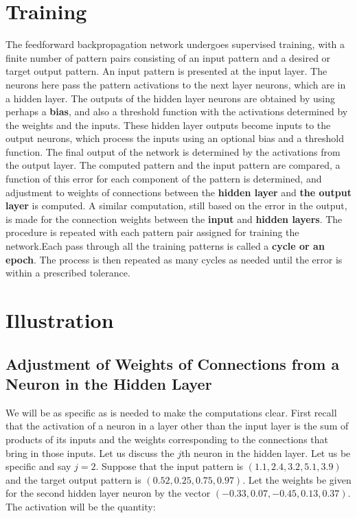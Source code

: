 \section{Training}

The feedforward backpropagation network undergoes supervised training, with
a finite number of pattern pairs consisting of an input pattern and a desired or
target output pattern. An input pattern is presented at the input layer. The
neurons here pass the pattern activations to the next layer neurons, which are
in a hidden layer. The outputs of the hidden layer neurons are obtained by
using perhaps a \textbf{bias}, and also a threshold function with the activations
determined by the weights and the inputs. These hidden layer outputs become
inputs to the output neurons, which process the inputs using an optional bias
and a threshold function. The final output of the network is determined by the
activations from the output layer.
The computed pattern and the input pattern are compared, a function of this
error for each component of the pattern is determined, and adjustment to
weights of connections between the \textbf{hidden layer} and \textbf{the output layer} is
computed. A similar computation, still based on the error in the output, is
made for the connection weights between the \textbf{input} and \textbf{hidden layers}. The
procedure is repeated with each pattern pair assigned for training the network.Each pass through all the training patterns is called a \textbf{cycle or an epoch}. The
process is then repeated as many cycles as needed until the error is within a
prescribed tolerance.

\section{Illustration}
\subsection{Adjustment of Weights of Connections from a Neuron in
the Hidden Layer}

We will be as specific as is needed to make the computations clear. First recall that the activation of a neuron in a layer other than the input layer is the sum of products of its inputs and the weights corresponding to the connections that bring in those inputs. Let us discuss the $j$th neuron in the hidden layer. Let us be specific and say $j = 2$. Suppose that the input pattern is $(1.1, 2.4, 3.2, 5.1, 3.9)$ and the target output pattern is $(0.52, 0.25, 0.75, 0.97)$. Let the weights be given for the second hidden layer
neuron by the vector $(-0.33, 0.07, -0.45, 0.13, 0.37)$. The activation will be the quantity:\\

